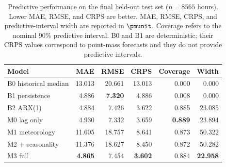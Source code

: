 \begin{table}[H]
\caption{Predictive performance on the final held-out test set ($n=8565$ hours). Lower MAE, RMSE, and CRPS are better. {MAE, RMSE, CRPS, and predictive-interval width are reported in $\pmunit$.} Coverage refers to the nominal 90\% predictive interval. B0 and B1 are deterministic; their CRPS values correspond to point-mass forecasts and they do not provide predictive intervals.\label{tab:test-performance}}
\centering
\small
\begin{tabular}{lrrrrr}
\toprule
\textbf{Model} & \textbf{MAE} & \textbf{RMSE} & \textbf{CRPS} & \textbf{Coverage} & \textbf{Width}\\
\midrule
B0 historical median & 13.013 & 20.661 & 13.013 & 0.000 & 0.000\\
B1 persistence & 4.886 & \textbf{7.320} & 4.886 & 0.008 & 0.000\\
B2 {ARX(1)} & 4.884 & 7.426 & 3.622 & 0.885 & 23.085\\
M0 lag only & 4.930 & 7.332 & 3.659 & \textbf{0.889} & 23.894\\
M1 meteorology & 11.605 & 18.757 & 8.641 & 0.873 & 50.322\\
M2 + seasonality & 11.376 & 18.627 & 8.450 & 0.872 & 50.282\\
M3 full & \textbf{4.865} & 7.454 & \textbf{3.602} & 0.884 & \textbf{22.958}\\
\bottomrule
\end{tabular}
\end{table}
